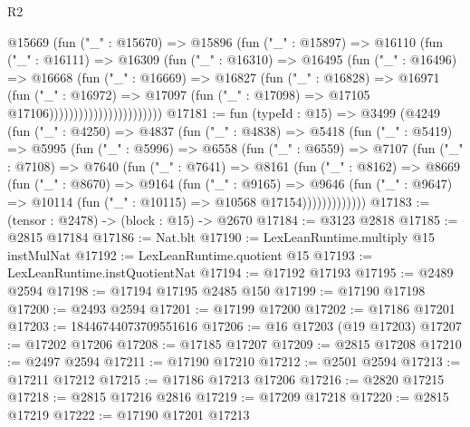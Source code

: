 \begin{lexlean}{R2}
\begin{coremodule}
                              @15669
                                (fun ("_" : @15670) =>
                                @15896
                                  (fun ("_" : @15897) =>
                                  @16110
                                    (fun ("_" : @16111) =>
                                    @16309
                                      (fun ("_" : @16310) =>
                                      @16495
                                        (fun ("_" : @16496) =>
                                        @16668
                                          (fun ("_" : @16669) =>
                                          @16827
                                            (fun ("_" : @16828) =>
                                            @16971
                                              (fun ("_" : @16972) =>
                                              @17097
                                                (fun ("_" : @17098) =>
                                                @17105 @17106)))))))))))))))))))))))
@17181 := fun (typeId : @15) =>
  @3499
    (@4249
      (fun ("_" : @4250) =>
      @4837
        (fun ("_" : @4838) =>
        @5418
          (fun ("_" : @5419) =>
          @5995
            (fun ("_" : @5996) =>
            @6558
              (fun ("_" : @6559) =>
              @7107
                (fun ("_" : @7108) =>
                @7640
                  (fun ("_" : @7641) =>
                  @8161
                    (fun ("_" : @8162) =>
                    @8669
                      (fun ("_" : @8670) =>
                      @9164
                        (fun ("_" : @9165) =>
                        @9646
                          (fun ("_" : @9647) =>
                          @10114 (fun ("_" : @10115) => @10568 @17154)))))))))))))
@17183 := (tensor : @2478) -> (block : @15) -> @2670
@17184 := @3123 @2818
@17185 := @2815 @17184
@17186 := Nat.blt
@17190 := LexLeanRuntime.multiply @15 instMulNat
@17192 := LexLeanRuntime.quotient @15
@17193 := LexLeanRuntime.instQuotientNat
@17194 := @17192 @17193
@17195 := @2489 @2594
@17198 := @17194 @17195 @2485 @150
@17199 := @17190 @17198
@17200 := @2493 @2594
@17201 := @17199 @17200
@17202 := @17186 @17201
@17203 := 18446744073709551616
@17206 := @16 @17203 (@19 @17203)
@17207 := @17202 @17206
@17208 := @17185 @17207
@17209 := @2815 @17208
@17210 := @2497 @2594
@17211 := @17190 @17210
@17212 := @2501 @2594
@17213 := @17211 @17212
@17215 := @17186 @17213 @17206
@17216 := @2820 @17215
@17218 := @2815 @17216 @2816
@17219 := @17209 @17218
@17220 := @2815 @17219
@17222 := @17190 @17201 @17213

\end{coremodule}
\end{lexlean}
